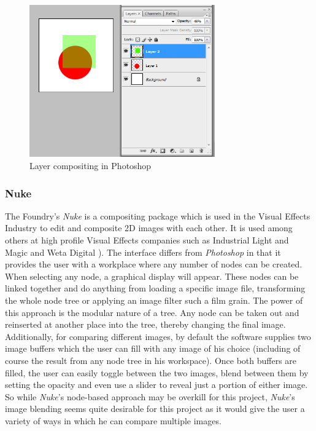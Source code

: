 \documentclass[a4paper,11pt,titlepage]{article}
\begin{document}
\begin{figure}[ht!]
\centering
\includegraphics[width=80mm]{graphics/photoshop_01.png}
\caption{Layer compositing in Photoshop}
\label{fig:UIdesign1}
\end{figure}

\subsubsection{Nuke}
The Foundry's \textit{Nuke} is a compositing package which is used in the Visual Effects Industry to edit and composite 2D images with each other. It is used among others at high profile Visual Effects companies such as Industrial Light and Magic and Weta Digital\cite{nuke1} \cite{nuke2}). The interface differs from \textit{Photoshop} in that it provides the user with a workplace where any number of nodes can be created. When selecting any node, a graphical display will appear. These nodes can be linked together and do anything from loading a specific image file, transforming the whole node tree or applying an image filter such a film grain. The power of this approach is the modular nature of a tree. Any node can be taken out and reinserted at another place into the tree, thereby changing the final image. Additionally, for comparing different images, by default the software supplies two image buffers which the user can fill with any image of his choice (including of course the result from any node tree in his workspace). Once both buffers are filled, the user can easily toggle between the two images, blend between them by setting the opacity and even use a slider to reveal just a portion of either image. So while \textit{Nuke}'s node-based approach may be overkill for this project, \textit{Nuke}'s image blending seems quite desirable for this project as it would give the user a variety of ways in which he can compare multiple images. 
\end{document}
